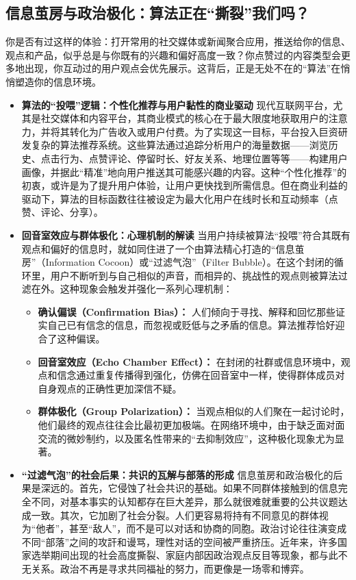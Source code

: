 \documentclass[UTF8, 10pt]{ctexbook}
\begin{document}
\subsection{信息茧房与政治极化：算法正在“撕裂”我们吗？}
你是否有过这样的体验：打开常用的社交媒体或新闻聚合应用，推送给你的信息、观点和产品，似乎总是与你既有的兴趣和偏好高度一致？你点赞过的内容类型会更多地出现，你互动过的用户观点会优先展示。这背后，正是无处不在的“算法”在悄悄塑造你的信息环境。
\begin{itemize}
    \item \textbf{算法的“投喂”逻辑：个性化推荐与用户黏性的商业驱动}
    现代互联网平台，尤其是社交媒体和内容平台，其商业模式的核心在于最大限度地获取用户的注意力，并将其转化为广告收入或用户付费。为了实现这一目标，平台投入巨资研发复杂的算法推荐系统。这些算法通过追踪分析用户的海量数据——浏览历史、点击行为、点赞评论、停留时长、好友关系、地理位置等等——构建用户画像，并据此“精准”地向用户推送其可能感兴趣的内容。这种“个性化推荐”的初衷，或许是为了提升用户体验，让用户更快找到所需信息。但在商业利益的驱动下，算法的目标函数往往被设定为最大化用户在线时长和互动频率（点赞、评论、分享）。

    \item \textbf{回音室效应与群体极化：心理机制的解读}
    当用户持续被算法“投喂”符合其既有观点和偏好的信息时，就如同住进了一个由算法精心打造的“信息茧房”（Information Cocoon）或“过滤气泡”（Filter Bubble）。在这个封闭的循环里，用户不断听到与自己相似的声音，而相异的、挑战性的观点则被算法过滤在外。这种现象会触发并强化一系列心理机制：
    \begin{itemize}
        \item \textbf{确认偏误（Confirmation Bias）：} 人们倾向于寻找、解释和回忆那些证实自己已有信念的信息，而忽视或贬低与之矛盾的信息。算法推荐恰好迎合了这种偏误。
        \item \textbf{回音室效应（Echo Chamber Effect）：} 在封闭的社群或信息环境中，观点和信念通过重复传播得到强化，仿佛在回音室中一样，使得群体成员对自身观点的正确性更加深信不疑。
        \item \textbf{群体极化（Group Polarization）：} 当观点相似的人们聚在一起讨论时，他们最终的观点往往会比最初更加极端。在网络环境中，由于缺乏面对面交流的微妙制约，以及匿名性带来的“去抑制效应”，这种极化现象尤为显著。
    \end{itemize}

    \item \textbf{“过滤气泡”的社会后果：共识的瓦解与部落的形成}
    信息茧房和政治极化的后果是深远的。首先，它侵蚀了社会共识的基础。如果不同群体接触到的信息完全不同，对基本事实的认知都存在巨大差异，那么就很难就重要的公共议题达成一致。其次，它加剧了社会分裂。人们更容易将持有不同意见的群体视为“他者”，甚至“敌人”，而不是可以对话和协商的同胞。政治讨论往往演变成不同“部落”之间的攻訐和谩骂，理性对话的空间被严重挤压。近年来，许多国家选举期间出现的社会高度撕裂、家庭内部因政治观点反目等现象，都与此不无关系。政治不再是寻求共同福祉的努力，而更像是一场零和博弈。


\end{itemize}
\end{document}
